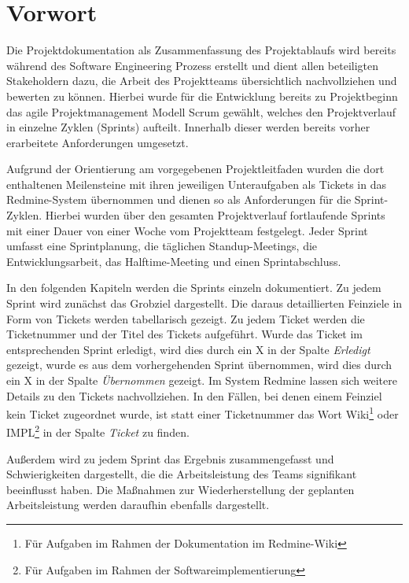 \documentclass[a4paper,11pt,listof=numbered,glossary=totoc,parskip=half,toc=bib]{scrreprt}
\begin{document}
	
	\newpage
	\setcounter{tocdepth}{2}
	\tableofcontents	
	\renewcommand \thechapter{\Roman{chapter}}
	\printglossaries

	


	
	\chapter{Vorwort}
	Die Projektdokumentation als Zusammenfassung des Projektablaufs wird bereits während des Software Engineering Prozess erstellt und dient allen beteiligten Stakeholdern dazu, die Arbeit des Projektteams übersichtlich nachvollziehen und bewerten zu können. Hierbei wurde für die Entwicklung bereits zu Projektbeginn das agile Projektmanagement Modell Scrum gewählt, welches den Projektverlauf in einzelne Zyklen (Sprints) aufteilt. Innerhalb dieser werden bereits vorher erarbeitete Anforderungen umgesetzt. 
	
	Aufgrund der Orientierung am vorgegebenen Projektleitfaden wurden die dort enthaltenen Meilensteine mit ihren jeweiligen Unteraufgaben als Tickets in das Redmine-System übernommen und dienen so als Anforderungen für die Sprint-Zyklen. Hierbei wurden über den gesamten Projektverlauf fortlaufende Sprints mit einer Dauer von einer Woche vom Projektteam festgelegt. Jeder Sprint umfasst eine Sprintplanung, die täglichen Standup-Meetings, die Entwicklungsarbeit, das Halftime-Meeting und einen Sprintabschluss.

In den folgenden Kapiteln werden die Sprints einzeln dokumentiert. Zu jedem Sprint wird zunächst das Grobziel dargestellt. Die daraus detaillierten Feinziele in Form von Tickets werden tabellarisch gezeigt. Zu jedem Ticket werden die Ticketnummer und der Titel des Tickets aufgeführt. Wurde das Ticket im entsprechenden Sprint erledigt, wird dies durch ein X in der Spalte \textit{Erledigt} gezeigt, wurde es aus dem vorhergehenden Sprint übernommen, wird dies durch ein X in der Spalte \textit{Übernommen} gezeigt. Im System Redmine lassen sich weitere Details zu den Tickets nachvollziehen. In den Fällen, bei denen einem Feinziel kein Ticket zugeordnet wurde, ist statt einer Ticketnummer das Wort Wiki\footnote{Für Aufgaben im Rahmen der Dokumentation im Redmine-Wiki} oder IMPL\footnote{Für Aufgaben im Rahmen der Softwareimplementierung} in der Spalte \textit{Ticket} zu finden.

Außerdem wird zu jedem Sprint das Ergebnis zusammengefasst und Schwierigkeiten dargestellt, die die Arbeitsleistung des Teams signifikant beeinflusst haben. Die Maßnahmen zur Wiederherstellung der geplanten Arbeitsleistung werden daraufhin ebenfalls dargestellt.
\end{document}
